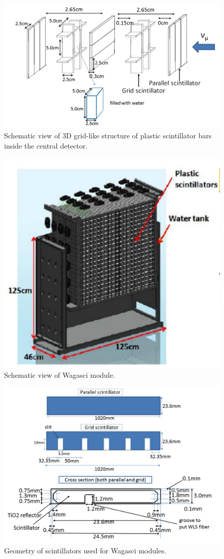 \begin{figure}[tbh]
\begin{center}
\includegraphics[width=1.0\linewidth]{fig/3d_grid_structure.pdf}
\end{center}
\caption{
Schematic view of 3D grid-like structure of plastic scintillator bars inside the central detector.
}
\label{fig:3dgrid}
\end{figure}

\begin{figure}[tbh]
\begin{center}
\includegraphics[width=0.6\linewidth]{fig/wagasci_mod.pdf}
\end{center}
\caption{
Schematic view of Wagasci module.
}
\label{fig:wagasci_mod}
\end{figure}

\begin{figure}[tbh]
\begin{center}
\includegraphics[width=0.8\linewidth]{fig/wagasci_scinti_geometry.pdf}
\end{center}
\caption{
Geometry of scintillators used for Wagasci modules.
}
\label{fig:wagasci_scinti_geometry}
\end{figure}


